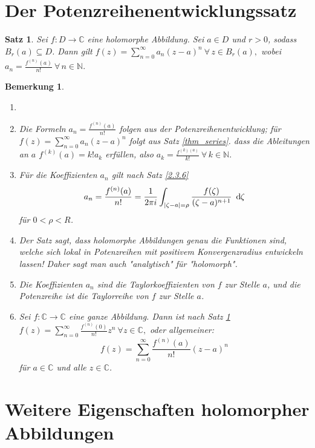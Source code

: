 \documentclass[a4paper,12pt]{book}
\theoremstyle{newthm}
\newtheorem{thm}{Satz}[section]
\theoremstyle{newdef}
\theoremstyle{newrem}
\newtheorem*{rem}{Bemerkung}
\newcommand{\N}{\mathbb{N}}
\newcommand{\C}{\mathbb{C}}
\renewcommand{\d}{\ \operatorname{d}\hspace{-2px}}
\begin{document}
	
	\section{Der Potenzreihenentwicklungssatz}
		
		\begin{thm}\label{2.4.1}
			Sei $ f: D \to \C $ eine holomorphe Abbildung. Sei $ a \in D $ und $r>0$, sodass $ B_r(a) \subseteq D $. Dann gilt $ f(z) = \sum_{n=0}^\infty a_n(z-a)^n\ \forall \, z \in B_r(a), $ wobei $ a_n = \frac{f^{(n)}(a)}{n!}\ \forall\, n \in \N. $
		\end{thm}
		
		\begin{rem}
			\begin{enumerate}
				\item[]
				\item Die Formeln $ a_n = \frac{f^{(n)}(a)}{n!} $ folgen aus der Potenzreihenentwicklung; für $ f(z) = \sum_{n=0}^\infty a_n(z-a)^n $ folgt aus Satz \ref{thm_series}. dass die Ableitungen an $a$ $ f^{(k)}(a) = k!a_k $ erfüllen, also $ a_k = \frac{f^{(k)(a)}}{k!}\ \forall\, k \in \N. $
				\item Für die Koeffizienten $a_n$ gilt nach Satz \ref{2.3.6} 
				$$ a_n = \frac{f^{(n)}(a)}{n!} = \frac{1}{2 \pi i} \int_{|\zeta-a|=\rho} \frac{f(\zeta)}{(\zeta-a)^{n+1}} \d \zeta $$
				für $ 0 < \rho < R $.
				\item Der Satz sagt, dass holomorphe Abbildungen genau die Funktionen sind, welche sich lokal in Potenzreihen mit positivem Konvergenzradius entwickeln lassen! Daher sagt man auch "analytisch" für "holomorph".
				\item Die Koeffizienten $a_n$ sind die \emph{Taylorkoeffizienten von $f$ zur Stelle $a$}, und die Potenzreihe ist die \emph{Taylorreihe von $f$ zur Stelle $a$}.
				\item Sei $ f: \C \to \C $ eine ganze Abbildung. Dann ist nach Satz \ref{2.4.1} $ f(z) = \sum_{n=0}^\infty \frac{f^{(n)}(0)}{n!} z^n\ \forall z \in \C, $ oder allgemeiner:
				\[ f(z) = \sum_{n=0}^\infty \frac{f^{(n)}(a)}{n!} (z-a)^n \]
				für $a \in \C$ und alle $z \in \C$.
			\end{enumerate}
		\end{rem}
	
	\section[Weitere Eigenschaften]{Weitere Eigenschaften holomorpher Abbildungen}
		
\end{document}
